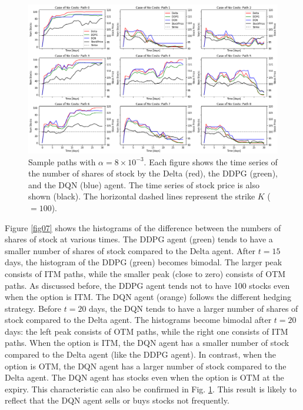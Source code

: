 \documentclass[11pt]{article}
\begin{document}
\begin{figure}[tb]
	\begin{center}
		\includegraphics[width=15cm]{../fig/fig06.png}
		\caption{Sample paths with $\alpha = 8 \times 10^{-3}$. Each figure shows the time series of the number of shares of stock by the Delta (red), the DDPG (green), and the DQN (blue) agent. The time series of stock price is also shown (black). The horizontal dashed lines represent the strike $K$ ($= 100$).}
		\label{fig06}
	\end{center}
\end{figure}

Figure \ref{fig07} shows the histograms of the difference between the numbers of shares of stock at various times. The DDPG agent (green) tends to have a smaller number of shares of stock compared to the Delta agent. After $t = 15$ days, the histogram of the DDPG (green) becomes bimodal. The larger peak consists of ITM paths, while the smaller peak (close to zero) consists of OTM paths. As discussed before, the DDPG agent tends not to have 100 stocks even when the option is ITM. The DQN agent (orange) follows the different hedging strategy. Before $t = 20$ days, the DQN tends to have a larger number of shares of stock compared to the Delta agent. The histograms become bimodal after $t = 20$ days: the left peak consists of OTM paths, while the right one consists of ITM paths. When the option is ITM, the DQN agent has a smaller number of stock compared to the Delta agent (like the DDPG agent). In contrast, when the option is OTM, the DQN agent has a larger number of stock compared to the Delta agent. The DQN agent has stocks even when the option is OTM at the expiry. This characteristic can also be confirmed in Fig. \ref{fig06}. This result is likely to reflect that the DQN agent sells or buys stocks not frequently.
\end{document}
